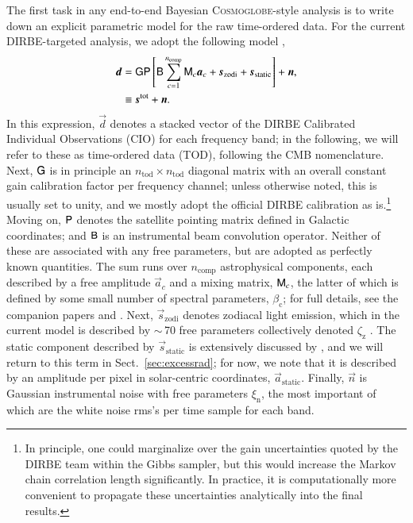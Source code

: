 \documentclass{aa}
\newcommand{\dv}[0]{\vec{d}}
\newcommand{\B}[0]{\tens{B}}
\newcommand{\G}[0]{\tens{G}}
\newcommand{\n}[0]{\vec{n}}
\newcommand{\s}[0]{\vec{s}}
\renewcommand{\a}[0]{\vec{a}}
\newcommand{\M}[0]{\tens{M}}
\renewcommand{\P}[0]{\tens{P}}
\newcommand{\cosmoglobe}{\textsc{Cosmoglobe}}
\begin{document}
The first task in any end-to-end Bayesian \cosmoglobe-style analysis
is to write down an explicit parametric model for the raw time-ordered
data. For the current DIRBE-targeted analysis, we adopt the following
model \citep{CG02_01},
\begin{align}
	\label{eq:model}
	\dv &=\G\P\left[\B\sum_{c=1}^{n_{\mathrm{comp}}}\M_c\a_c+\s_{\mathrm{zodi}} +
          \s_{\mathrm{static}}\right] + \n,\\
        &\equiv \s^{\mathrm{tot}} + \n.
\end{align}
In this expression, $\dv$ denotes a stacked vector of the DIRBE
Calibrated Individual Observations (CIO) for each frequency band; in
the following, we will refer to these as time-ordered data (TOD),
following the CMB nomenclature. Next, $\G$ is in principle an
$n_{\mathrm{tod}}\times n_{\mathrm{tod}}$ diagonal matrix with an
overall constant gain calibration factor per frequency channel; unless
otherwise noted, this is usually set to unity, and we mostly adopt the
official DIRBE calibration as is.\footnote{In principle, one could
marginalize over the gain uncertainties quoted by the DIRBE team
within the Gibbs sampler, but this would increase the Markov chain
correlation length significantly. In practice, it is computationally
more convenient to propagate these uncertainties analytically into the
final results.}  Moving on, $\P$ denotes the satellite pointing
matrix defined in Galactic coordinates; and $\B$ is an
instrumental beam convolution operator. Neither of these are
associated with any free parameters, but are adopted as perfectly
known quantities. The sum runs over $n_{\mathrm{comp}}$ astrophysical
components, each described by a free amplitude $\a_c$ and a mixing
matrix, $\M_c$, the latter of which is defined by some small number of
spectral parameters, $\beta_{\mathrm{c}}$; for full details, see
the companion papers \citet{CG02_04} and \citet{CG02_05}. Next, $\s_{\mathrm{zodi}}$ denotes zodiacal
light emission, which in the current model is described by $\sim$\,70
free parameters collectively denoted $\zeta_{\mathrm{z}}$
\citep{CG02_02}. The static component described by
$\s_{\mathrm{static}}$ is extensively discussed by \citet{CG02_01},
and we will return to this term in Sect.~\ref{sec:excessrad}; for now,
we note that it is described by an amplitude per pixel in
solar-centric coordinates, $\a_{\mathrm{static}}$. Finally, $\n$
is Gaussian instrumental noise with free parameters
$\xi_{\mathrm{n}}$, the most important of which are the white noise
rms's per time sample for each band.
\end{document}

